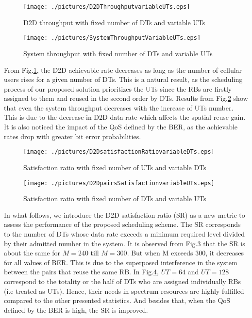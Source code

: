 \documentclass[conference,onecolumn,12pt]{IEEEtran}
\begin{document}
\begin{figure}
\centering
\texttt{[image: ./pictures/D2DThroughputvariableUTs.eps]}
\caption{D2D throughput with fixed number of DTs and variable UTs  }\label{D2DThroughputvariableUTs}
\end{figure}
\begin{figure}
\centering
\texttt{[image: ./pictures/SystemThroughputVariableUTs.eps]}
\caption{System throughput with fixed number of DTs and variable UTs }\label{SystemThroughputVariableUTs}
\end{figure}
From Fig.\ref{D2DThroughputvariableUTs}, the D2D achievable rate decreases as long as the number of cellular users rises for a given number of DTs. This is a natural result, as the scheduling process of our proposed solution prioritizes the UTs since the RBs are firstly assigned to them and reused in the second order by DTs. Results from Fig.\ref{SystemThroughputVariableUTs} show that even the system throughput decreases with the increase of UTs number. This is due to the decrease in D2D data rate which affects the spatial reuse gain. It is also noticed the impact of the QoS defined by the BER, as the achievable rates drop with greater bit error probabilities.\\
\begin{figure}
\centering
\texttt{[image: ./pictures/D2DsatisfactionRatiovariableDTs.eps]}
\caption{Satisfaction ratio with fixed number of UTs and variable DTs }\label{D2DsatisfactionRatiovariableDTs}
\end{figure}
\begin{figure}
\centering
\texttt{[image: ./pictures/D2DpairsSatisfactionvariableUTs.eps]}
\caption{Satisfaction ratio with fixed number of DTs and variable UTs }\label{D2DpairsSatisfactionvariableUTs}
\end{figure}
In what follows, we introduce the D2D satisfaction ratio (SR) as a new metric to assess the performance of the proposed scheduling scheme. The SR corresponds to the number of DTs whose data rate exceeds a minimum required level divided by their admitted number in the system. It is observed from Fig.\ref{D2DsatisfactionRatiovariableDTs} that the SR is about the same for $M=240$ till $M=300$. But when M exceeds 300, it decreases for all values of BER. This is due to the superposed interference in the system between the pairs that reuse the same RB. In Fig.\ref{D2DpairsSatisfactionvariableUTs}, $UT=64$ and $UT=128$ correspond to the totality or the half of DTs who are assigned individually RBs (i.e treated as UTs). Hence, their needs in spectrum resources are highly fulfilled compared to the other presented statistics. And besides that, when the QoS defined by the BER is high, the SR is improved.
\end{document}
